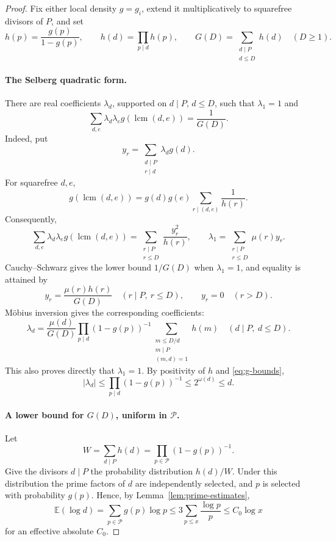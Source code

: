 \documentclass[11pt]{article}
\theoremstyle{definition}
\theoremstyle{remark}
\numberwithin{equation}{section}
\newcommand{\lcm}{\operatorname{lcm}}
\begin{document}
\begin{proof}
Fix either local density \(g=g_i\), extend it multiplicatively to
squarefree divisors of \(P\), and set
\[
 h(p)=\frac{g(p)}{1-g(p)},\qquad
 h(d)=\prod_{p\mid d}h(p),\qquad
 G(D)=\sum_{\substack{d\mid P\\d\le D}}h(d)
 \quad(D\ge1).
\]

\paragraph{The Selberg quadratic form.}
There are real coefficients \(\lambda_d\), supported on
\(d\mid P\), \(d\le D\), such that \(\lambda_1=1\) and
\begin{equation}\label{eq:selberg-minimum}
 \sum_{d,e}\lambda_d\lambda_e g(\lcm(d,e))
 =\frac1{G(D)}.
\end{equation}
Indeed, put
\[
 y_r=\sum_{\substack{d\mid P\\r\mid d}}\lambda_d g(d).
\]
For squarefree \(d,e\),
\[
 g(\lcm(d,e))
 =g(d)g(e)\sum_{r\mid(d,e)}\frac1{h(r)}.
\]
Consequently,
\begin{equation}\label{eq:diagonalization}
 \sum_{d,e}\lambda_d\lambda_e g(\lcm(d,e))
 =\sum_{\substack{r\mid P\\r\le D}}\frac{y_r^2}{h(r)},
 \qquad
 \lambda_1=\sum_{\substack{r\mid P\\r\le D}}\mu(r)y_r.
\end{equation}
Cauchy--Schwarz gives the lower bound \(1/G(D)\) when
\(\lambda_1=1\), and equality is attained by
\[
 y_r=\frac{\mu(r)h(r)}{G(D)}
 \quad(r\mid P,\ r\le D),
 \qquad y_r=0\quad(r>D).
\]
M\"obius inversion gives the corresponding coefficients:
\begin{equation}\label{eq:lambda-formula}
 \lambda_d=
 \frac{\mu(d)}{G(D)}
 \prod_{p\mid d}(1-g(p))^{-1}
 \sum_{\substack{m\le D/d\\m\mid P\\(m,d)=1}}h(m)
 \quad(d\mid P,\ d\le D).
\end{equation}
This also proves directly that \(\lambda_1=1\). By positivity of
\(h\) and \eqref{eq:g-bounds},
\begin{equation}\label{eq:lambda-size}
 |\lambda_d|
 \le\prod_{p\mid d}(1-g(p))^{-1}
 \le2^{\omega(d)}\le d.
\end{equation}

\paragraph{A lower bound for \(G(D)\), uniform in \(\mathcal P\).}
Let
\[
 W=\sum_{d\mid P}h(d)
   =\prod_{p\in\mathcal P}(1-g(p))^{-1}.
\]
Give the divisors \(d\mid P\) the probability distribution
\(h(d)/W\). Under this distribution the prime factors of \(d\)
are independently selected, and \(p\) is selected with probability
\(g(p)\). Hence, by Lemma~\ref{lem:prime-estimates},
\[
 \mathbb E(\log d)
 =\sum_{p\in\mathcal P}g(p)\log p
 \le3\sum_{p\le x}\frac{\log p}{p}
 \le C_0\log x
\]
for an effective absolute \(C_0\).


\end{proof}
\end{document}
